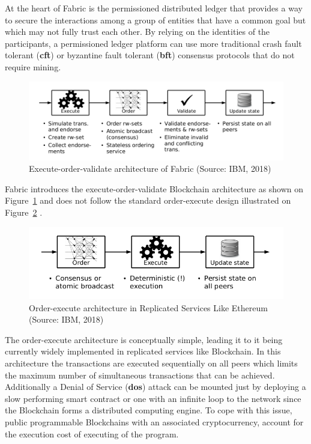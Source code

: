 At the heart of Fabric is the permissioned distributed ledger that provides a
way to secure the interactions among a group of entities that have a common
goal but which may not fully trust each other. By relying on the identities of
the participants, a permissioned ledger platform can use more traditional crash
fault tolerant (\textbf{cft}) or byzantine fault tolerant (\textbf{bft})
consensus protocols that do not require mining.

\begin{figure}[h]
  \centering
  \includegraphics[width=1\linewidth]{imgs/executeOrderValidate.png}
  \caption{\label{fig:executeorder} Execute-order-validate architecture of
  Fabric (Source: IBM, 2018)}
\end{figure}

Fabric introduces the execute-order-validate Blockchain architecture as shown
on Figure~\ref{fig:executeorder} and does not follow the standard order-execute
design illustrated on Figure~\ref{fig:orderexecute} \cite{Androulaki2018}. 

\begin{figure}[h]
  \centering
  \includegraphics[width=0.8\linewidth]{imgs/orderExecuteArchitecture.png}
  \caption{\label{fig:orderexecute} Order-execute architecture in Replicated
  Services Like Ethereum (Source: IBM, 2018)}
\end{figure}

The order-execute architecture is conceptually simple, leading it to it being
currently widely implemented in replicated services like Blockchain. In this
architecture the transactions are executed sequentially on all peers  which
limits the maximum number of simultaneous transactions that can be achieved.
Additionally a Denial of Service (\textbf{dos}) attack can be mounted just by
deploying a slow performing smart contract or one with an infinite loop to the
network since the Blockchain forms a distributed computing engine.  To cope
with this issue, public programmable Blockchains with an associated
cryptocurrency, account for the execution cost of executing of the program.

